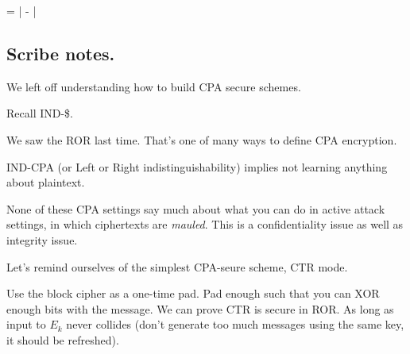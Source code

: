 
\bnm
\AdvSTPRP{\tweakCipher}{\advA} = \left| -
                                     \right|
\enm


\subsection{Scribe notes.}

We left off understanding how to build CPA secure schemes.

Recall IND-\$. 

We saw the ROR last time. That's one of many ways to define CPA encryption.

IND-CPA (or Left or Right indistinguishability) implies not learning anything about plaintext.

None of these CPA settings say much about what you can do in active attack settings, in which ciphertexts are \emph{mauled}. This is a confidentiality issue as well as integrity issue.

Let's remind ourselves of the simplest CPA-seure scheme, CTR mode.

Use the block cipher as a one-time pad. Pad enough such that you can XOR enough bits with the message. We can prove CTR is secure in ROR. As long as input to $E_k$ never collides (don't generate too much messages using the same key, it should be refreshed).

